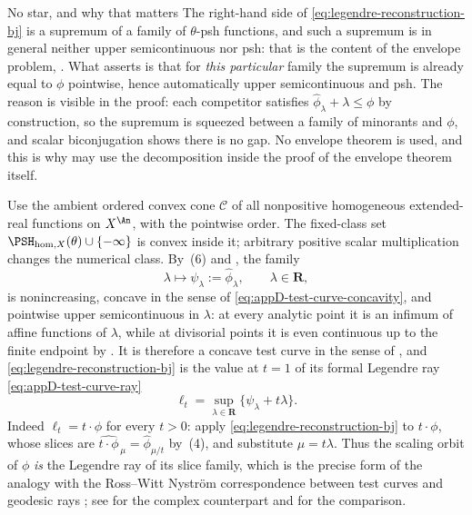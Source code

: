 \begin{warning}{No star, and why that matters}
The right-hand side of \eqref{eq:legendre-reconstruction-bj} is a supremum
of a family of $\theta$-psh functions, and such a supremum is in general
neither upper semicontinuous nor psh: that is the content of the envelope
problem, .  What
 asserts is that for
\emph{this particular} family the supremum is already equal to
$\phi$ pointwise, hence automatically upper semicontinuous and psh.  The
reason is visible in the proof: each competitor satisfies
$\widehat\phi_\lambda+\lambda\leq\phi$ by construction, so the supremum is
squeezed between a family of minorants and $\phi$, and scalar
biconjugation shows there is no gap.  No envelope theorem is used, and this
is why  may use the decomposition inside the proof
of the envelope theorem itself.
\end{warning}

\begin{remark}
\label{rem:ch35-test-curve}
Use the ambient ordered convex cone $\mathcal C$ of all nonpositive
homogeneous extended-real functions on $X^{\An}$, with the pointwise
order. The fixed-class set
$\PSH_{\mathrm{hom},X}(\theta)\cup\{-\infty\}$ is convex inside it;
arbitrary positive scalar multiplication changes the numerical class.  By
\,(6) and
, the family
\[
 \lambda\longmapsto\psi_\lambda:=\widehat\phi_\lambda,
 \qquad\lambda\in\mathbf R,
\]
is nonincreasing, concave in the sense of
\eqref{eq:appD-test-curve-concavity}, and pointwise upper semicontinuous in
$\lambda$: at every analytic point it is an infimum of affine functions
of $\lambda$, while at divisorial points it is even continuous up to the
finite endpoint by .  It is therefore a
concave test curve in the
sense of , and
\eqref{eq:legendre-reconstruction-bj} is the value at $t=1$ of its formal
Legendre ray \eqref{eq:appD-test-curve-ray}
\[
 \ell_t=\sup_{\lambda\in\mathbf R}\{\psi_\lambda+t\lambda\}.
\]
Indeed $\ell_t=t\cdot\phi$ for every $t>0$: apply
\eqref{eq:legendre-reconstruction-bj} to $t\cdot\phi$, whose slices are
$\widehat{t\cdot\phi}_{\,\mu}=\widehat\phi_{\mu/t}$ by
\,(4), and substitute $\mu=t\lambda$.  Thus the
scaling orbit of $\phi$ \emph{is} the Legendre ray of its slice family,
which is the precise form of the analogy with the Ross--Witt Nystr\"om
correspondence between test curves and geodesic rays
\cite{RWN14}; see  for the complex
counterpart and  for the comparison.
\end{remark}

